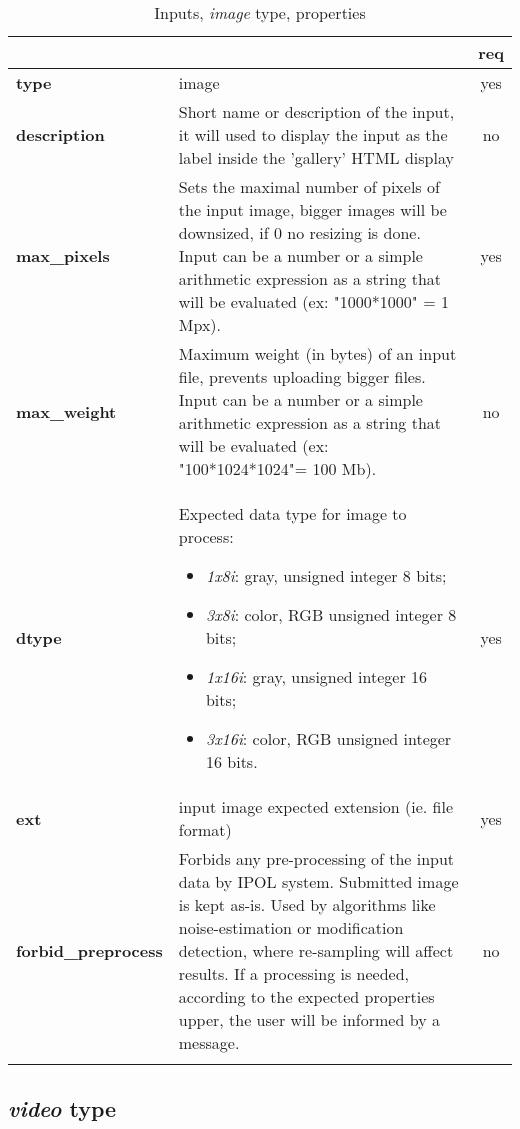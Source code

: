 \begin{longtable}{|>{\bf}L{\linewidth}|L{\linewidth}|c|}
\hline
{}     &  & {\bf req} \tabularnewline 
\hline \hline
 type         & image & yes \\ \hline
 description  & Short name or description of the input, it will used to display 
the input as the label inside the 'gallery' HTML display & no \\ \hline
 max\_pixels   &  Sets the maximal number of pixels of the input image, 
bigger images will be downsized, if 0 no resizing is done. 
Input can be a number or a simple arithmetic expression as a string that will be evaluated (ex: "1000*1000" = 1 Mpx).  & yes \\ \hline
 max\_weight   & Maximum weight (in bytes) of an input file, prevents uploading 
bigger files.
Input can be a number or a simple arithmetic expression as a string that will be evaluated (ex: "100*1024*1024"= 100 Mb). & no \\ \hline
 dtype        & Expected data type for image to process:
\vspace{-1em}
\begin{itemize}
  \setlength\itemsep{-0.5em}
  \item \textit{1x8i}: gray, unsigned integer 8 bits;
  \item \textit{3x8i}: color, RGB unsigned integer 8 bits;
  \item \textit{1x16i}: gray, unsigned integer 16 bits;
  \item \textit{3x16i}: color, RGB unsigned integer 16 bits.
\end{itemize} 
\vspace{-1em} & yes \\ \hline
 ext          & input image expected extension (ie. file format) & yes \\ \hline
forbid\_preprocess         & Forbids any pre-processing of the input data by IPOL system. 
Submitted image is kept as-is.
Used by algorithms like noise-estimation or modification detection, where re-sampling will affect results. 
If a processing is needed, according to the expected properties upper, the user will be informed by a message.
& no \\ \hline
\caption{Inputs, \emph{image} type, properties}
\end{longtable}

\subsection{\emph{video} type}


